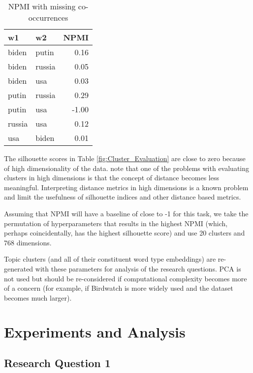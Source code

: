 \documentclass [11pt, proquest] {uwthesis}[2020/02/24]
\begin{document}
\begin{table}
\centering
\caption{NPMI with missing co-occurrences}
\begin{tabular}{llr}
\toprule
    w1 &     w2 &  NPMI \\
\midrule
 biden &  putin &              0.16 \\
 biden & russia &              0.05 \\
 biden &    usa &              0.03 \\
 putin & russia &              0.29 \\
 putin &    usa &             -1.00 \\
russia &    usa &              0.12 \\
   usa &  biden &              0.01 \\
\bottomrule
\end{tabular}
\label{fig:Missing_Pairs}
\end{table}

The silhouette scores in Table \ref{fig:Cluster_Evaluation}  are close to zero because of high dimensionality of the data. \cite{kriegel2009clustering} note that one of the problems with evaluating clusters in high dimensions is that the concept of distance becomes less meaningful.  Interpreting distance metrics in high dimensions is a known problem \citep{tomavsev2016clustering} and limit the usefulness of silhouette indices and other distance based metrics.

Assuming that NPMI will have a baseline of close to -1 for this task, we take the permutation of hyperparameters that results in the highest NPMI (which, perhaps coincidentally, has the highest silhouette score) and use 20 clusters and 768 dimensions.

Topic clusters (and all of their constituent word type embeddings) are re-generated with these parameters for analysis of the research questions. PCA is not used but should be re-considered if computational complexity becomes more of a concern (for example, if Birdwatch is more widely used and the dataset becomes much larger).

\chapter{Experiments and Analysis} \label{section:experiments}

\section{Research Question 1}
\end{document}
